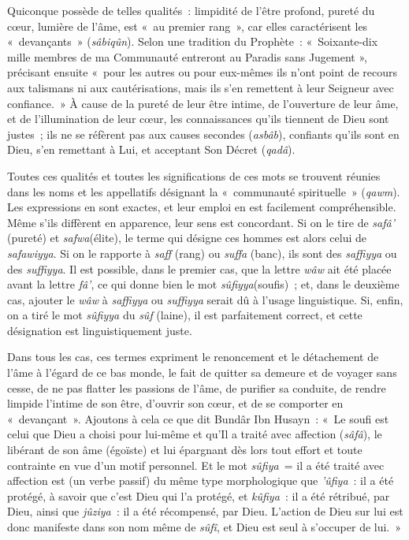 Quiconque possède de telles qualités~: limpidité de l'être profond,
pureté du cœur, lumière de l'âme, est «~au premier rang~», car elles
caractérisent les «~devançants~» (\emph{sâbiqûn}). Selon une tradition
du Prophète~: «~Soixante-dix mille membres de ma Communauté entreront au
Paradis sans Jugement », précisant ensuite «~pour les autres ou pour
eux-mêmes ils n'ont point de recours aux talismans ni aux
cautérisations, mais ils s'en remettent à leur Seigneur avec
confiance.~» À cause de la pureté de leur être intime, de l'ouverture de
leur âme, et de l'illumination de leur cœur, les connaissances qu'ils
tiennent de Dieu sont justes~; ils ne se réfèrent pas aux causes
secondes (\emph{asbâb}), confiants qu'ils sont en Dieu, s'en remettant à
Lui, et acceptant Son Décret (\emph{qadâ}).

Toutes ces qualités et toutes les significations de ces mots se trouvent
réunies dans les noms et les appellatifs désignant la «~communauté
spirituelle~» (\emph{qawm}). Les expressions en sont exactes, et leur
emploi en est facilement compréhensible. Même s'ils diffèrent en
apparence, leur sens est concordant. Si on le tire de \emph{safâ'}
(pureté) et \emph{safwa}(élite), le terme qui désigne ces hommes est
alors celui de \emph{safawiyya}. Si on le rapporte à \emph{saff} (rang)
ou \emph{suffa} (banc), ils sont des \emph{saffiyya} ou des
\emph{suffiyya}. Il est possible, dans le premier cas, que la lettre
\emph{wâw} ait été placée avant la lettre \emph{fâ'}, ce qui donne bien
le mot \emph{sûfiyya}(soufis)~; et, dans le deuxième cas, ajouter le
\emph{wâw} à \emph{saffiyya} ou \emph{suffiyya} serait dû à l'usage
linguistique. Si, enfin, on a tiré le mot \emph{sûfiyya} du \emph{sûf}
(laine), il est parfaitement correct, et cette désignation est
linguistiquement juste.

Dans tous les cas, ces termes expriment le renoncement et le détachement
de l'âme à l'égard de ce bas monde, le fait de quitter sa demeure et de
voyager sans cesse, de ne pas flatter les passions de l'âme, de purifier
sa conduite, de rendre limpide l'intime de son être, d'ouvrir son cœur,
et de se comporter en «~devançant~». Ajoutons à cela ce que dit Bundâr
Ibn Husayn~: «~Le soufi est celui que Dieu a choisi pour lui-même et
qu'Il a traité avec affection (\emph{sâfâ}), le libérant de son âme
(égoïste) et lui épargnant dès lors tout effort et toute contrainte en
vue d'un motif personnel. Et le mot \emph{sûfiya~}= il a été traité avec
affection est (un verbe passif) du même type morphologique que
\emph{'ûfiya}~: il a été protégé, à savoir que c'est Dieu qui l'a
protégé, et \emph{kûfiya~}: il a été rétribué, par Dieu, ainsi que
\emph{jûziya~}: il a été récompensé, par Dieu. L'action de Dieu sur lui
est donc manifeste dans son nom même de \emph{sûfî}, et Dieu est seul à
s'occuper de lui.~»

